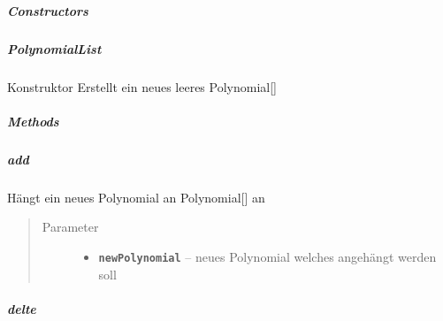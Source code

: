 \documentclass[letterpaper,10pt,ngerman]{sphinxmanual}
\begin{document}
\subparagraph{Constructors}
\label{com/linuxluigi/polynomial/PolynomialList:constructors}

\subparagraph{PolynomialList}
\label{com/linuxluigi/polynomial/PolynomialList:id1}

\begin{fulllineitems}
\label{com/linuxluigi/polynomial/PolynomialList:com.linuxluigi.polynomial.PolynomialList.PolynomialList()}
Konstruktor Erstellt ein neues leeres Polynomial{[}{]}

\end{fulllineitems}



\subparagraph{Methods}
\label{com/linuxluigi/polynomial/PolynomialList:methods}

\subparagraph{add}
\label{com/linuxluigi/polynomial/PolynomialList:add}

\begin{fulllineitems}
\label{com/linuxluigi/polynomial/PolynomialList:com.linuxluigi.polynomial.PolynomialList.add(Polynomial)}
Hängt ein neues Polynomial an Polynomial{[}{]} an
\begin{quote}\begin{description}
\item[{Parameter}] \leavevmode\begin{itemize}
\item {} 
\textbf{\texttt{newPolynomial}} -- neues Polynomial welches angehängt werden soll

\end{itemize}

\end{description}\end{quote}

\end{fulllineitems}



\subparagraph{delte}
\label{com/linuxluigi/polynomial/PolynomialList:delte}
\end{document}
